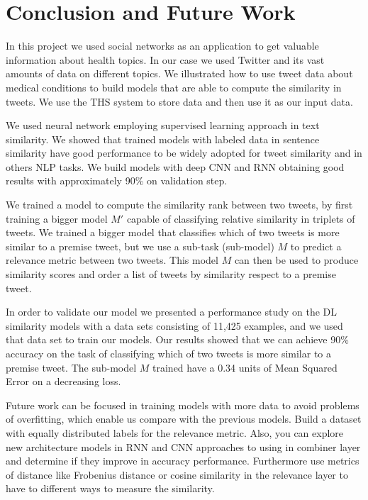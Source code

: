 \documentclass[12pt]{report}
\begin{document}

\chapter{Conclusion and Future Work} \label{chapter 6}
In this project we used social networks as an application to get valuable information about health topics. In our case we used Twitter and its  vast amounts of data on different topics. We illustrated how to use tweet data about medical conditions to build models that are able to compute the similarity in tweets. We use the {THS} system to store data and then use it as our input data.

We used neural network employing supervised learning approach in text similarity. We showed that trained models with labeled data in sentence similarity have good performance to be widely adopted for tweet similarity and in others \ac{NLP} tasks. We build models with deep \ac{CNN} and \ac{RNN}  obtaining good results with approximately 90\% on validation step.

We trained a model to compute the similarity rank between two tweets, by first training a bigger model $M'$ capable of classifying relative similarity in triplets of tweets. We trained a bigger model that classifies which of two tweets is more similar to a premise tweet, but we use a sub-task (sub-model) $M$ to predict a relevance metric between  two tweets. This model $M$ can then be used to produce similarity scores and order a list of tweets by similarity respect to a premise tweet.

In order to validate our model we presented a performance study on the DL similarity models with a data sets consisting of 11,425 examples, and we used that data set to train our models. Our results showed that we can achieve 90\% accuracy on the task of classifying which of two tweets is more similar to a premise tweet. The sub-model $M$ trained have a 0.34 units of Mean Squared Error on a decreasing loss.

Future work can be focused in training models with more data to avoid problems of overfitting, which enable us compare with the previous models. 
Build a dataset with equally distributed labels for the relevance metric.
Also, you can explore new architecture models in {RNN} and {CNN} approaches to using in combiner layer and determine if they improve in accuracy performance. 
Furthermore use metrics of distance like Frobenius distance or cosine similarity in the relevance layer to have to different ways to measure the similarity.
\end{document}
